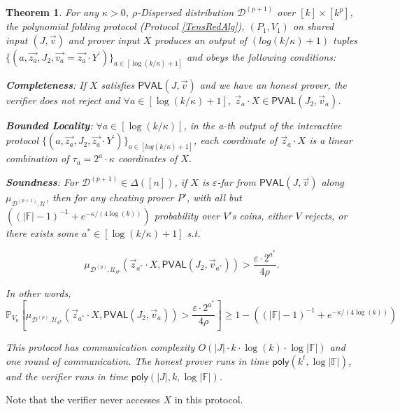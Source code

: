 \documentclass[11pt]{article}
\newtheorem{theorem}{Theorem}[section]
\newcommand{\poly}{\mathsf{poly}}
\newcommand{\PVAL}{\mathsf{PVAL}}
\newcommand{\F}{\mathbb{F}}
\newcommand{\sD}{\mathcal{D}}
\begin{document}
\begin{theorem}
\label{TensRed}
For any $\kappa>0$, $\rho$-Dispersed distribution $\sD^{(p+1)} $ over $[k]\times [k^{p}]$, the polynomial folding protocol (Protocol \ref{TensRedAlg}), $(P_{1}, V_{1})$ on shared input  $(J, \vec{v})$ and prover input $X$ produces an output of $(log(k/\kappa) + 1)$ tuples $\{(a, \vec{z_{a}}, J_{2}, \vec{v_{a}}=\vec{z_{a}}\cdot  Y^\prime)\}_{a\in[\log(k/\kappa)+1]}$ and obeys the following conditions: 

\textbf{Completeness}: If $X$ satisfies $\PVAL(J,\vec{v})$ and we have an honest prover, the verifier does not reject and $\forall a\in [\log(k/\kappa)+1]$, $\Vec{z}_{a}\cdot X\in\PVAL(J_{2},\vec{v}_{a})$. 
\newline

\textbf{Bounded Locality}: $\forall a\in [\log(k/\kappa)]$, in the a-th output of the interactive protocol $\{(a, \vec{z_{a}}, J_{2}, \vec{z_{a}}\cdot  Y^\prime)\}_{a\in[log(k/\kappa)+1]}$, each coordinate of $\Vec{z}_{a}\cdot X$ is a linear combination of $\tau_{a}=2^{a}\cdot \kappa$ coordinates of $X$.
\newline

\textbf{Soundness}:  For $\sD^{(p+1)}\in \Delta([n])$, if $X$ is $\varepsilon$-far from $\PVAL(J, \vec{v})$ along $\mu_{\mathcal{D}^{(p+1)},\mathcal{U}}$, then for any cheating prover $P'$, with all but $((\vert \F\vert -1)^{-1} + e^{-\kappa/(4 \log (k))})$ probability over $V'$s coins, either $V$ rejects, or there exists some $a^{\ast}\in [\log(k/\kappa) + 1]$ s.t. 

\begin{equation*}\mu_{\mathcal{D}^{(p)}, \mathcal{U}_{k^{p}}}(\Vec{z}_{a^{\ast}}\cdot X,\PVAL(J_{2}, \vec{v}_{a^{\ast}}))>\frac{\varepsilon \cdot 2^{a^{\ast}}}{4\rho}.
\end{equation*}

In other words,
\begin{equation*}
    \mathbb{P}_{V_{0}}\left[\mu_{\mathcal{D}^{(p)}, \mathcal{U}_{k^{p}}}(\Vec{z}_{a^{\ast}}\cdot X,\PVAL(J_{2}, \vec{v}_{a}))>\frac{\varepsilon \cdot 2^{a^{\ast}}}{4\rho}\right]\geq 1-((\vert \F\vert -1)^{-1} + e^{-\kappa/(4 \log (k))})
\end{equation*}

This protocol has communication complexity $O(\vert J\vert  \cdot  k \cdot \log (k) \cdot \log \vert \F\vert )$ and one round of communication. The honest prover runs in time $\poly(k^{t}, \log \vert \F\vert )$, and the verifier runs in time $\poly(\vert J\vert, k, \log \vert \F\vert )$.  
\end{theorem}
\noindent Note that the verifier never accesses $X$ in this protocol. 
\end{document}
